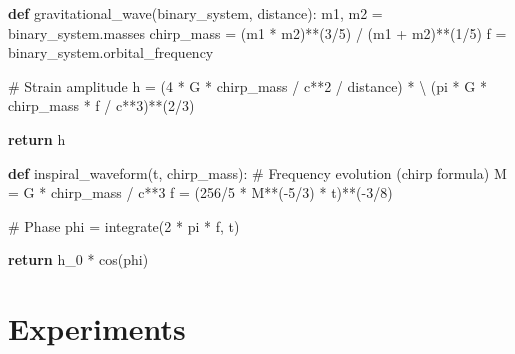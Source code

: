 \documentclass[
  11pt,
  letterpaper,
  twoside,
  openright]{book}
\newenvironment{Shaded}{\begin{snugshade}}{\end{snugshade}}
\newcommand{\CommentTok}[1]{\textcolor[rgb]{0.37,0.37,0.37}{#1}}
\newcommand{\ControlFlowTok}[1]{\textcolor[rgb]{0.00,0.23,0.31}{\textbf{#1}}}
\newcommand{\DecValTok}[1]{\textcolor[rgb]{0.68,0.00,0.00}{#1}}
\newcommand{\KeywordTok}[1]{\textcolor[rgb]{0.00,0.23,0.31}{\textbf{#1}}}
\newcommand{\NormalTok}[1]{\textcolor[rgb]{0.00,0.23,0.31}{#1}}
\newcommand{\OperatorTok}[1]{\textcolor[rgb]{0.37,0.37,0.37}{#1}}
\begin{document}
\begin{Shaded}
\begin{Highlighting}[]
\KeywordTok{def}\NormalTok{ gravitational\_wave(binary\_system, distance):}
\NormalTok{    m1, m2 }\OperatorTok{=}\NormalTok{ binary\_system.masses}
\NormalTok{    chirp\_mass }\OperatorTok{=}\NormalTok{ (m1 }\OperatorTok{*}\NormalTok{ m2)}\OperatorTok{**}\NormalTok{(}\DecValTok{3}\OperatorTok{/}\DecValTok{5}\NormalTok{) }\OperatorTok{/}\NormalTok{ (m1 }\OperatorTok{+}\NormalTok{ m2)}\OperatorTok{**}\NormalTok{(}\DecValTok{1}\OperatorTok{/}\DecValTok{5}\NormalTok{)}
\NormalTok{    f }\OperatorTok{=}\NormalTok{ binary\_system.orbital\_frequency}

    \CommentTok{\# Strain amplitude}
\NormalTok{    h }\OperatorTok{=}\NormalTok{ (}\DecValTok{4} \OperatorTok{*}\NormalTok{ G }\OperatorTok{*}\NormalTok{ chirp\_mass }\OperatorTok{/}\NormalTok{ c}\OperatorTok{**}\DecValTok{2} \OperatorTok{/}\NormalTok{ distance) }\OperatorTok{*} \OperatorTok{\textbackslash{}}
\NormalTok{        (pi }\OperatorTok{*}\NormalTok{ G }\OperatorTok{*}\NormalTok{ chirp\_mass }\OperatorTok{*}\NormalTok{ f }\OperatorTok{/}\NormalTok{ c}\OperatorTok{**}\DecValTok{3}\NormalTok{)}\OperatorTok{**}\NormalTok{(}\DecValTok{2}\OperatorTok{/}\DecValTok{3}\NormalTok{)}

    \ControlFlowTok{return}\NormalTok{ h}

\KeywordTok{def}\NormalTok{ inspiral\_waveform(t, chirp\_mass):}
    \CommentTok{\# Frequency evolution (chirp formula)}
\NormalTok{    M }\OperatorTok{=}\NormalTok{ G }\OperatorTok{*}\NormalTok{ chirp\_mass }\OperatorTok{/}\NormalTok{ c}\OperatorTok{**}\DecValTok{3}
\NormalTok{    f }\OperatorTok{=}\NormalTok{ (}\DecValTok{256}\OperatorTok{/}\DecValTok{5} \OperatorTok{*}\NormalTok{ M}\OperatorTok{**}\NormalTok{(}\OperatorTok{{-}}\DecValTok{5}\OperatorTok{/}\DecValTok{3}\NormalTok{) }\OperatorTok{*}\NormalTok{ t)}\OperatorTok{**}\NormalTok{(}\OperatorTok{{-}}\DecValTok{3}\OperatorTok{/}\DecValTok{8}\NormalTok{)}

    \CommentTok{\# Phase}
\NormalTok{    phi }\OperatorTok{=}\NormalTok{ integrate(}\DecValTok{2} \OperatorTok{*}\NormalTok{ pi }\OperatorTok{*}\NormalTok{ f, t)}

    \ControlFlowTok{return}\NormalTok{ h\_0 }\OperatorTok{*}\NormalTok{ cos(phi)}
\end{Highlighting}
\end{Shaded}

\section{Experiments}\label{experiments-34}
\end{document}
